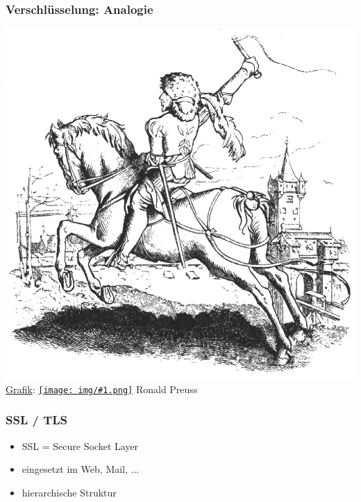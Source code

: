 \documentclass[12pt]{beamer}
\newcommand{\cc}[1]{\texttt{[image: img/\#1.png]}\hspace{1mm}}
\begin{document}
\begin{frame}
    \frametitle{Verschlüsselung: Analogie}
    \includegraphics[height=0.7\textheight]{img/bote.jpg}
    {\\ \small \href{http://commons.wikimedia.org/wiki/File:Reitbote.jpg}{Grafik}: \href{http://creativecommons.org/licenses/by-sa/2.5/deed.en}{\cc{by-sa}} Ronald Preuss}
\end{frame}


\begin{frame}
    \frametitle{SSL / TLS}
    \begin{itemize}
      \item<2-> SSL = Secure Socket Layer
      \item<3-> eingesetzt im Web, Mail, ...
      \item<4-> hierarchische Struktur
    \end{itemize}
\end{frame}
\end{document}
